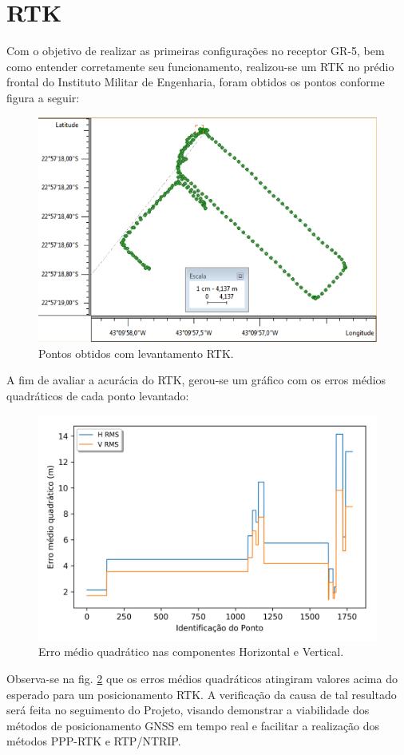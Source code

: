 \section{RTK}
Com o objetivo de realizar as primeiras configurações no receptor GR-5, bem como entender corretamente seu funcionamento, realizou-se um RTK no prédio frontal do Instituto Militar de Engenharia, foram obtidos os pontos conforme figura a seguir:

\begin{figure}[H]
\centering
\includegraphics[scale=0.55]{img/rtk/mapa_rtk.png}
\caption{Pontos obtidos com levantamento RTK.}
\label{}
\end{figure}

A fim de avaliar a acurácia do RTK, gerou-se um gráfico com os erros médios quadráticos de cada ponto levantado:

\begin{figure}[H]
\centering
\includegraphics[scale=0.8]{img/rtk/rtk_rms.png}
\caption{Erro médio quadrático nas componentes Horizontal e Vertical.}
\label{rms_rtk}
\end{figure}

Observa-se na fig. \ref{rms_rtk} que os erros médios quadráticos atingiram valores acima do esperado para um posicionamento RTK. A verificação da causa de tal resultado será feita no seguimento do Projeto, visando demonstrar a viabilidade dos métodos de posicionamento GNSS em tempo real e facilitar a realização dos métodos PPP-RTK e RTP/NTRIP.





